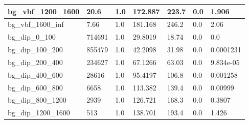 \documentclass[a4paper, 10pt]{article}
\begin{document}
\begin{table}[H]
\begin{center}
\begin{tabular}{|m{23.0mm}|m{23.0mm}|m{18.0mm}|m{19.0mm}|m{19.0mm}|m{19.0mm}|m{19.0mm}|}
      \hline
      {\cellcolor{white}         bg\_vbf\_1200\_1600}& {\cellcolor{white}         20.6}& {\cellcolor{white}         1.0}& {\cellcolor{white}         172.887}& {\cellcolor{white}         223.7}& {\cellcolor{green}         0.0}& {\cellcolor{green}         1.906}\\
      \hline
      {\cellcolor{white}         bg\_vbf\_1600\_inf}& {\cellcolor{white}         7.66}& {\cellcolor{white}         1.0}& {\cellcolor{white}         181.168}& {\cellcolor{white}         246.2}& {\cellcolor{green}         0.0}& {\cellcolor{green}         2.06}\\
      \hline
      {\cellcolor{white}         bg\_dip\_0\_100}& {\cellcolor{white}         714691}& {\cellcolor{white}         1.0}& {\cellcolor{white}         29.8019}& {\cellcolor{white}         18.74}& {\cellcolor{green}         0.0}& {\cellcolor{green}         0.0}\\
      \hline
      {\cellcolor{white}         bg\_dip\_100\_200}& {\cellcolor{white}         855479}& {\cellcolor{white}         1.0}& {\cellcolor{white}         42.2098}& {\cellcolor{white}         31.98}& {\cellcolor{green}         0.0}& {\cellcolor{green}         0.0001231}\\
      \hline
      {\cellcolor{white}         bg\_dip\_200\_400}& {\cellcolor{white}         234627}& {\cellcolor{white}         1.0}& {\cellcolor{white}         67.1266}& {\cellcolor{white}         63.03}& {\cellcolor{green}         0.0}& {\cellcolor{green}         9.834e-05}\\
      \hline
      {\cellcolor{white}         bg\_dip\_400\_600}& {\cellcolor{white}         28616}& {\cellcolor{white}         1.0}& {\cellcolor{white}         95.4197}& {\cellcolor{white}         106.8}& {\cellcolor{green}         0.0}& {\cellcolor{green}         0.001258}\\
      \hline
      {\cellcolor{white}         bg\_dip\_600\_800}& {\cellcolor{white}         6658}& {\cellcolor{white}         1.0}& {\cellcolor{white}         113.382}& {\cellcolor{white}         139.4}& {\cellcolor{green}         0.0}& {\cellcolor{green}         0.00999}\\
      \hline
      {\cellcolor{white}         bg\_dip\_800\_1200}& {\cellcolor{white}         2939}& {\cellcolor{white}         1.0}& {\cellcolor{white}         126.721}& {\cellcolor{white}         168.3}& {\cellcolor{green}         0.0}& {\cellcolor{green}         0.3807}\\
      \hline
      {\cellcolor{white}         bg\_dip\_1200\_1600}& {\cellcolor{white}         513}& {\cellcolor{white}         1.0}& {\cellcolor{white}         138.701}& {\cellcolor{white}         193.4}& {\cellcolor{green}         0.0}& {\cellcolor{green}         1.426}\\

\end{tabular}
\end{center}
\end{table}
\end{document}
